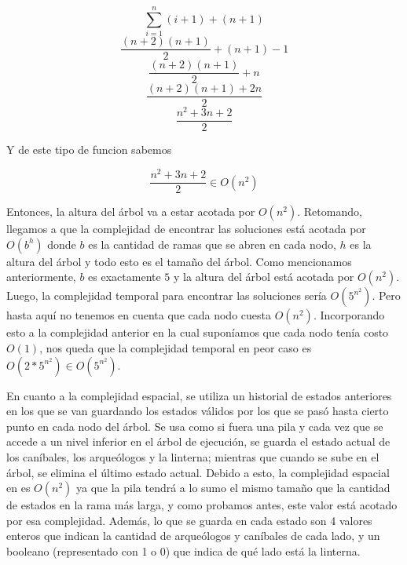       \[
      \sum_{i=1}^{n}(i+1) + (n+1)
      \]
      \[
      \frac{(n+2)(n+1)}{2} + (n+1) - 1
      \]
      \[
      \frac{(n+2)(n+1)}{2} + n
      \]
      \[
      \frac{(n+2)(n+1)+2n}{2}
      \]
      \[
      \frac{n^2+3n+2}{2}
      \]

      Y de este tipo de funcion sabemos \newline

      \[
      \frac{n^2+3n+2}{2} \in O(n^2)
      \]

      Entonces, la altura del árbol va a estar acotada por $O(n^2)$.
      Retomando, llegamos a que la complejidad de encontrar las soluciones está acotada por $O(b^h)$ donde $b$ es la cantidad de ramas que se abren en cada nodo, $h$ es la altura del árbol y todo esto es el tamaño del árbol. Como mencionamos anteriormente, $b$ es exactamente $5$ y la altura del árbol está acotada por $O(n^2)$. Luego, la complejidad temporal para encontrar las soluciones sería $O(5^{n^2})$. Pero hasta aquí no tenemos en cuenta que cada nodo cuesta $O(n^2)$. Incorporando esto a la complejidad anterior en la cual suponíamos que cada nodo tenía costo $O(1)$, nos queda que la complejidad temporal en peor caso es $O(2 * 5^{n^2}) \in O(5^{n^2})$.

      En cuanto a la complejidad espacial, se utiliza un historial de estados anteriores en los que se van guardando los estados válidos por los que se pasó hasta cierto punto en cada nodo del árbol. Se usa como si fuera una pila y cada vez que se accede a un nivel inferior en el árbol de ejecución, se guarda el estado actual de los caníbales, los arqueólogos y la linterna; mientras que cuando se sube en el árbol, se elimina el último estado actual. Debido a esto, la complejidad espacial en es $O(n^2)$ ya que la pila tendrá a lo sumo el mismo tamaño que la cantidad de estados en la rama más larga, y como probamos antes, este valor está acotado por esa complejidad. Además, lo que se guarda en cada estado son 4 valores enteros que indican la cantidad de arqueólogos y caníbales de cada lado, y un booleano (representado con 1 o 0) que indica de qué lado está la linterna.



